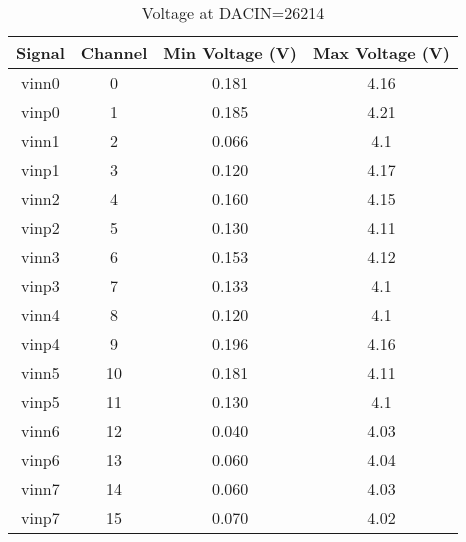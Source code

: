 \begin{table}[h!]
	\centering
	\caption{Voltage at DACIN=26214}
	\begin{tabular}{ |c|c|c|c| }
		\hline
		\textbf{Signal} & \textbf{Channel} & \textbf{Min Voltage (V)} & \textbf{Max Voltage (V)} \\
		\hline
		vinn0           & 0                & 0.181                    & 4.16                     \\
		\hline
		vinp0           & 1                & 0.185                    & 4.21                     \\
		\hline
		vinn1           & 2                & 0.066                    & 4.1                      \\
		\hline
		vinp1           & 3                & 0.120                    & 4.17                     \\
		\hline
		vinn2           & 4                & 0.160                    & 4.15                     \\
		\hline
		vinp2           & 5                & 0.130                    & 4.11                     \\
		\hline
		vinn3           & 6                & 0.153                    & 4.12                     \\
		\hline
		vinp3           & 7                & 0.133                    & 4.1                      \\
		\hline
		vinn4           & 8                & 0.120                    & 4.1                      \\
		\hline
		vinp4           & 9                & 0.196                    & 4.16                     \\
		\hline
		vinn5           & 10               & 0.181                    & 4.11                     \\
		\hline
		vinp5           & 11               & 0.130                    & 4.1                      \\
		\hline
		vinn6           & 12               & 0.040                    & 4.03                     \\
		\hline
		vinp6           & 13               & 0.060                    & 4.04                     \\
		\hline
		vinn7           & 14               & 0.060                    & 4.03                     \\
		\hline
		vinp7           & 15               & 0.070                    & 4.02                     \\
		\hline
	\end{tabular}
\end{table}

